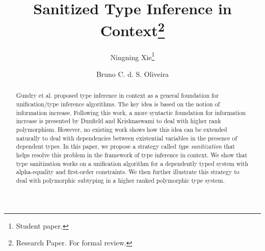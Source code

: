 \documentclass[oribibl]{llncs}
\begin{document}
\title{Sanitized Type Inference in Context\thanks{Research Paper. For formal review.}}

\author{Ningning Xie\thanks{Student paper.} \and Bruno C. d. S. Oliveira}

\maketitle

\begin{abstract}
  Gundry et al. proposed type inference in context as a general foundation for
  unification/type inference algorithms. The key idea is based on the notion of
  information increase. Following this work, a more syntactic foundation for
  information increase is presented by Dunfield and Krishnaswami to deal with higher rank polymorphism.
  However, no existing work shows how this idea can be extended naturally to deal
  with dependencies between existential variables in the presence of dependent types.
  In this paper, we propose a strategy called \textit{type
    sanitization} that helps resolve this problem
  in the framework of type inference in context. We show
  that type sanitization works on a unification algorithm for a dependently typed
  system with alpha-equality and first-order constraints. We then further illustrate
  this strategy to deal with polymorphic subtyping in a higher ranked
  polymorphic type system.
\end{abstract}




\setlength{\belowcaptionskip}{-1pt}








% 



\appendix



\end{document}

